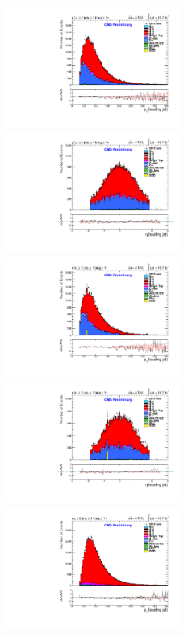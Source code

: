 \documentclass[oneside, a4paper, 11pt, ]{report}
\begin{document}
\begin{figure}
\includegraphics[width=0.5\textwidth]{Plots/ControlPlots/TTbarDiLeptonAnalysis/MuMu/Jets/jet1_pT_splitTTbar_ratio.pdf}
\includegraphics[width=0.5\textwidth]{Plots/ControlPlots/TTbarDiLeptonAnalysis/MuMu/Jets/jet1_eta_splitTTbar_ratio.pdf}\\
\includegraphics[width=0.5\textwidth]{Plots/ControlPlots/TTbarDiLeptonAnalysis/EE/Jets/jet1_pT_splitTTbar_ratio.pdf}
\includegraphics[width=0.5\textwidth]{Plots/ControlPlots/TTbarDiLeptonAnalysis/EE/Jets/jet1_eta_splitTTbar_ratio.pdf} \\
\includegraphics[width=0.5\textwidth]{Plots/ControlPlots/TTbarDiLeptonAnalysis/EMu/Jets/jet1_pT_splitTTbar_ratio.pdf}

\end{figure}
\end{document}
